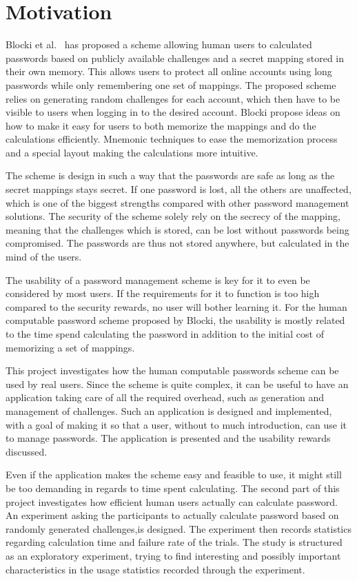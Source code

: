 \section{Motivation}
Blocki et al.~\cite{Blocki2014,hcp-blocki} has proposed a scheme allowing human users to calculated passwords based on publicly available challenges and a secret mapping stored in their own memory. This allows users to protect all online accounts using long passwords while only remembering one set of mappings. The proposed scheme relies on generating random challenges for each account, which then have to be visible to users when logging in to the desired account. Blocki propose ideas on how to make it easy for users to both memorize the mappings and do the calculations efficiently. Mnemonic techniques to ease the memorization process and a special layout making the calculations more intuitive.
\par The scheme is design in such a way that the passwords are safe as long as the secret mappings stays secret. If one password is lost, all the others are unaffected, which is one of the biggest strengths compared with other password management solutions. The security of the scheme solely rely on the secrecy of the mapping, meaning that the challenges which is stored, can be lost without passwords being compromised. The passwords are thus not stored anywhere, but calculated in the mind of the users. 
\par The usability of a password management scheme is key for it to even be considered by most users. If the requirements for it to function is too high compared to the security rewards, no user will bother learning it. For the human computable password scheme proposed by Blocki, the usability is mostly related to the time spend calculating the password in addition to the initial cost of memorizing a set of mappings.
\par This project investigates how the human computable passwords scheme can be used by real users. Since the scheme is quite complex, it can be useful to have an application taking care of all the required overhead, such as generation and management of challenges. Such an application is designed and implemented, with a goal of making it so that a user, without to much introduction, can use it to manage passwords. The application is presented and the usability rewards discussed.
\par Even if the application makes the scheme easy and feasible to use, it might still be too demanding in regards to time spent calculating. The second part of this project investigates how efficient human users actually can calculate password. An experiment asking the participants to actually calculate password based on randomly generated challenges,is designed. The experiment then records statistics regarding calculation time and failure rate of the trials. The study is structured as an exploratory experiment, trying to find interesting and possibly important characteristics in the usage statistics recorded through the experiment.

